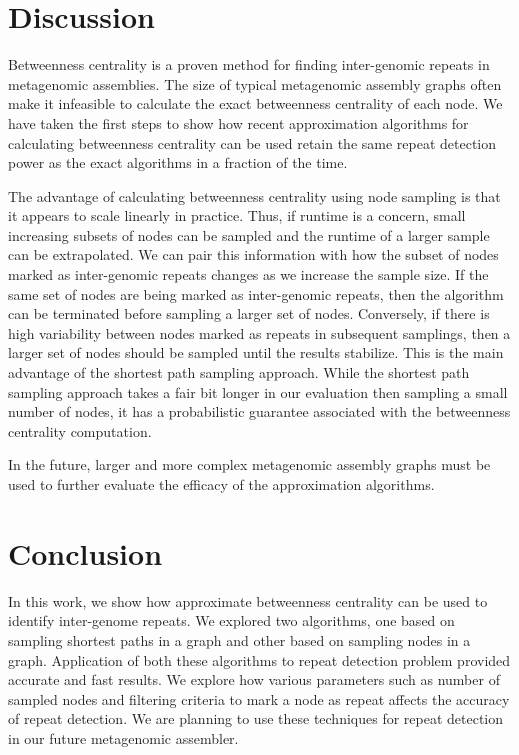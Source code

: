 \documentclass[runningheads,a4paper]{llncs}
\begin{document}
\section{Discussion}
Betweenness centrality is a proven method for finding inter-genomic repeats in metagenomic assemblies.
The size of typical metagenomic assembly graphs often make it infeasible to calculate the exact betweenness centrality of each node.
We have taken the first steps to show how recent approximation algorithms for calculating betweenness centrality can be used retain the same repeat detection power as the exact algorithms in a fraction of the time.

The advantage of calculating betweenness centrality using node sampling is that it appears to scale linearly in practice.
Thus, if runtime is a concern, small increasing subsets of nodes can be sampled and the runtime of a larger sample can be extrapolated.
We can pair this information with how the subset of nodes marked as inter-genomic repeats changes as we increase the sample size.
If the same set of nodes are being marked as inter-genomic repeats, then the algorithm can be terminated before sampling a larger set of nodes.
Conversely, if there is high variability between nodes marked as repeats in subsequent samplings, then a larger set of nodes should be sampled until the results stabilize.
This is the main advantage of the shortest path sampling approach.
While the shortest path sampling approach takes a fair bit longer in our evaluation then sampling a small number of nodes, it has a probabilistic guarantee associated with the betweenness centrality computation.

In the future, larger and more complex metagenomic assembly graphs must be used to further evaluate the efficacy of the approximation algorithms.

\section{Conclusion}
In this work, we show how approximate betweenness centrality can be used to identify inter-genome repeats. We explored two algorithms, one based on sampling shortest paths in a graph and other based on sampling nodes in a graph. Application of both these algorithms to repeat detection problem provided accurate and fast results. We explore how various parameters such as number of sampled nodes and filtering criteria to mark a node as repeat affects the accuracy of repeat detection. We are planning to use these techniques for repeat detection in our future metagenomic assembler. 
{}

\end{document}
